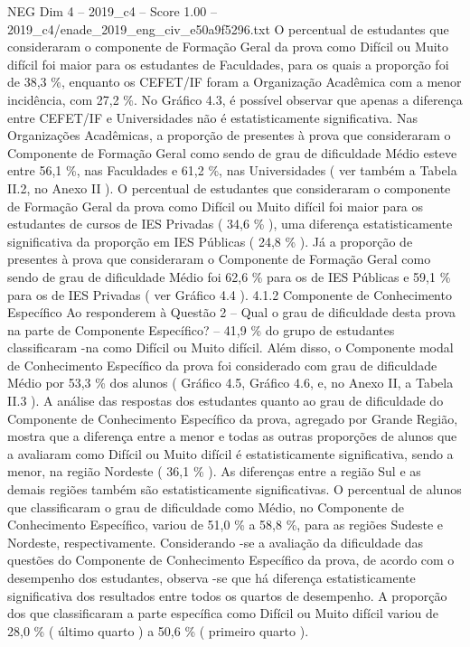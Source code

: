 \begin{textsample}{NEG Dim 4 – 2019\_c4 – Score 1.00 – 2019\_c4/enade\_2019\_eng\_civ\_e50a9f5296.txt}
O percentual de estudantes que consideraram o componente de Formação Geral da prova como Difícil ou Muito difícil foi maior para os estudantes de Faculdades, para os quais a proporção foi de 38,3 \%, enquanto os CEFET/IF foram a Organização Acadêmica com a menor incidência, com 27,2 \%.
No Gráfico 4.3, é possível observar que apenas a diferença entre CEFET/IF e Universidades não é estatisticamente significativa.
Nas Organizações Acadêmicas, a proporção de presentes à prova que consideraram o Componente de Formação Geral como sendo de grau de dificuldade Médio esteve entre 56,1 \%, nas Faculdades e 61,2 \%, nas Universidades ( ver também a Tabela II.2, no Anexo II ).
O percentual de estudantes que consideraram o componente de Formação Geral da prova como Difícil ou Muito difícil foi maior para os estudantes de cursos de IES Privadas ( 34,6 \% ), uma diferença estatisticamente significativa da proporção em IES Públicas ( 24,8 \% ).
Já a proporção de presentes à prova que consideraram o Componente de Formação Geral como sendo de grau de dificuldade Médio foi 62,6 \% para os de IES Públicas e 59,1 \% para os de IES Privadas ( ver Gráfico 4.4 ). 4.1.2 Componente de Conhecimento Específico Ao responderem à Questão 2 – Qual o grau de dificuldade desta prova na parte de Componente Específico? – 41,9 \% do grupo de estudantes classificaram -na como Difícil ou Muito difícil.
Além disso, o Componente modal de Conhecimento Específico da prova foi considerado com grau de dificuldade Médio por 53,3 \% dos alunos ( Gráfico 4.5, Gráfico 4.6, e, no Anexo II, a Tabela II.3 ).
A análise das respostas dos estudantes quanto ao grau de dificuldade do Componente de Conhecimento Específico da prova, agregado por Grande Região, mostra que a diferença entre a menor e todas as outras proporções de alunos que a avaliaram como Difícil ou Muito difícil é estatisticamente significativa, sendo a menor, na região Nordeste ( 36,1 \% ).
As diferenças entre a região Sul e as demais regiões também são estatisticamente significativas.
O percentual de alunos que classificaram o grau de dificuldade como Médio, no Componente de Conhecimento Específico, variou de 51,0 \% a 58,8 \%, para as regiões Sudeste e Nordeste, respectivamente.
Considerando -se a avaliação da dificuldade das questões do Componente de Conhecimento Específico da prova, de acordo com o desempenho dos estudantes, observa -se que há diferença estatisticamente significativa dos resultados entre todos os quartos de desempenho.
A proporção dos que classificaram a parte específica como Difícil ou Muito difícil variou de 28,0 \% ( último quarto ) a 50,6 \% ( primeiro quarto ).

\end{textsample}
